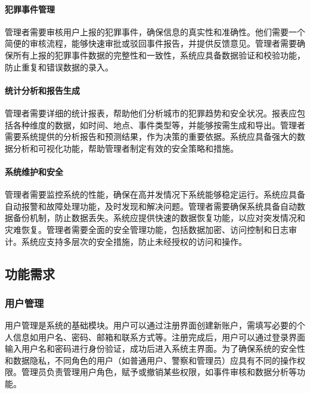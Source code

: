 \paragraph{犯罪事件管理}

管理者需要审核用户上报的犯罪事件，确保信息的真实性和准确性。他们需要一个简便的审核流程，能够快速审批或驳回事件报告，并提供反馈意见。管理者需要确保所有上报的犯罪事件数据的完整性和一致性，系统应具备数据验证和校验功能，防止重复和错误数据的录入。

\paragraph{统计分析和报告生成}

管理者需要详细的统计报表，帮助他们分析城市的犯罪趋势和安全状况。报表应包括各种维度的数据，如时间、地点、事件类型等，并能够按需生成和导出。管理者需要系统提供的分析报告和预测结果，作为决策的重要依据。系统应具备强大的数据分析和可视化功能，帮助管理者制定有效的安全策略和措施。

\paragraph{系统维护和安全}

管理者需要监控系统的性能，确保在高并发情况下系统能够稳定运行。系统应具备自动报警和故障处理功能，及时发现和解决问题。管理者需要确保系统具备自动数据备份机制，防止数据丢失。系统应提供快速的数据恢复功能，以应对突发情况和灾难恢复。管理者需要全面的安全管理功能，包括数据加密、访问控制和日志审计。系统应支持多层次的安全措施，防止未经授权的访问和操作。






\subsection{功能需求}

\subsubsection{用户管理}

用户管理是系统的基础模块。用户可以通过注册界面创建新账户，需填写必要的个人信息如用户名、密码、邮箱和联系方式等。注册完成后，用户可以通过登录界面输入用户名和密码进行身份验证，成功后进入系统主界面。为了确保系统的安全性和数据隐私，不同角色的用户（如普通用户、警察和管理员）应具有不同的操作权限。管理员负责管理用户角色，赋予或撤销某些权限，如事件审核和数据分析等功能。

